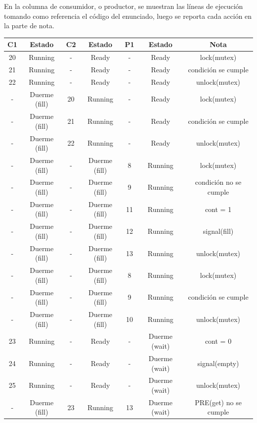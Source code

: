 \documentclass[12pt]{article}
\begin{document}
\begin{rta}
    En la columna de consumidor, o productor, se muestran las líneas de ejecución tomando como referencia el código del enunciado, luego se reporta cada acción en la parte de nota. \newline
    \begin{tabular}{|c|c|c|c|c|c|c|}
        \hline
        \rowcolor{cyan!20} %
        \textbf{C1} & \textbf{Estado} & \textbf{C2}& \textbf{Estado}  & \textbf{P1}& \textbf{Estado}   & \textbf{Nota}  \\
        \hline
        20 & Running          & -  & Ready                & -  & Ready & lock(mutex)         \\
        21 & Running          & -  & Ready                & -  & Ready & condición se cumple \\
        22 & Running          & -  & Ready                & -  & Ready & unlock(mutex)       \\
        -  & Duerme (fill) & 20 & Running              & -  & Ready & lock(mutex)         \\
        -  & Duerme (fill) & 21 & Running              & -  & Ready & condición se cumple \\
        -  & Duerme (fill) & 22 & Running              & -  & Ready & unlock(mutex)       \\
        -  & Duerme (fill) & -  & Duerme (fill)     & 8  & Running & lock(mutex)       \\
        -  & Duerme (fill) & -  & Duerme (fill)     & 9  & Running & condición no se cumple \\
        - & Duerme (fill) & -  & Duerme (fill)      & 11 & Running & cont = 1     \\
        - & Duerme (fill) & -  & Duerme (fill)      & 12 & Running & signal(fill) \\
        - & Duerme (fill) & -  & Duerme (fill)      & 13 & Running & unlock(mutex) \\
        - & Duerme (fill) & -  & Duerme (fill)      & 8  & Running & lock(mutex) \\
        - & Duerme (fill) & -  & Duerme (fill)      & 9  & Running & condición se cumple \\
        - & Duerme (fill) & -  & Duerme (fill)      & 10 & Running & unlock(mutex) \\
        23& Running           & -  & Ready                & -  & Duerme (wait) & cont = 0 \\
        24& Running           & -  & Ready                & -  & Duerme (wait)  & signal(empty) \\
        25& Running           & -  & Ready                & -  & Duerme (wait)  & unlock(mutex) \\
        - & Duerme (fill) & 23  & Running      & 13 & Duerme (wait) & PRE(get) no se cumple \\
        \hline
    \end{tabular}
\end{rta}
\end{document}

